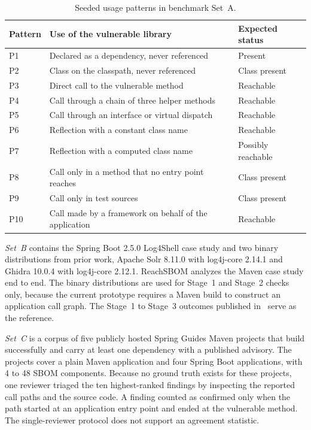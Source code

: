 \documentclass[conference]{IEEEtran}
\begin{document}
\begin{table}[t]
\caption{Seeded usage patterns in benchmark Set~A.}
\label{tab:patterns}
\centering
\footnotesize
\renewcommand{\arraystretch}{1.1}
\begin{tabular}{@{}l p{1.85in} p{0.85in}@{}}
\toprule
Pattern & Use of the vulnerable library & Expected status \\
\midrule
P1 & Declared as a dependency, never referenced & Present \\
P2 & Class on the classpath, never referenced & Class present \\
P3 & Direct call to the vulnerable method & Reachable \\
P4 & Call through a chain of three helper methods & Reachable \\
P5 & Call through an interface or virtual dispatch & Reachable \\
P6 & Reflection with a constant class name & Reachable \\
P7 & Reflection with a computed class name & Possibly reachable \\
P8 & Call only in a method that no entry point reaches & Class present \\
P9 & Call only in test sources & Class present \\
P10 & Call made by a framework on behalf of the application & Reachable \\
\bottomrule
\end{tabular}
\end{table}

\emph{Set~B} contains the Spring Boot 2.5.0 Log4Shell case study and two binary distributions from prior work, Apache Solr 8.11.0 with log4j-core 2.14.1 and Ghidra 10.0.4 with log4j-core 2.12.1. ReachSBOM analyzes the Maven case study end to end. The binary distributions are used for Stage~1 and Stage~2 checks only, because the current prototype requires a Maven build to construct an application call graph. The Stage~1 to Stage~3 outcomes published in~\cite{grgic} serve as the reference.

\emph{Set~C} is a corpus of five publicly hosted Spring Guides Maven projects that build successfully and carry at least one dependency with a published advisory. The projects cover a plain Maven application and four Spring Boot applications, with 4 to 48 SBOM components. Because no ground truth exists for these projects, one reviewer triaged the ten highest-ranked findings by inspecting the reported call paths and the source code. A finding counted as confirmed only when the path started at an application entry point and ended at the vulnerable method. The single-reviewer protocol does not support an agreement statistic.
\end{document}
